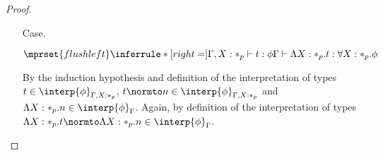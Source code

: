 \begin{proof}
\begin{itemize}
  
\item[Case.]\ \\
  \begin{center}
    \begin{math}
      $$\mprset{flushleft}
      \inferrule* [right=] {
        \Gamma, X : *_p \vdash t : \phi
      }{\Gamma \vdash \Lambda X:*_p.t:\forall X:*_p.\phi}
    \end{math}
  \end{center}
  By the induction hypothesis and definition of the interpretation of types 
  $t \in \interp{\phi}_{\Gamma,X:*_p}$, $t \normto n \in \interp{\phi}_{\Gamma,X:*_p}$ and 
  $\Lambda X:*_p.n \in \interp{\phi}_{\Gamma}$.  Again, by definition of the interpretation 
  of types $\Lambda X:*_p.t \normto \Lambda X:*_p.n \in \interp{\phi}_{\Gamma}$.


\end{itemize}
\end{proof}
